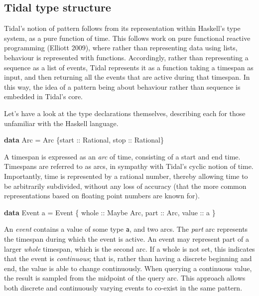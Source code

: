 \documentclass{nime-alternate} %
\newenvironment{Shaded}{\begin{snugshade}}{\end{snugshade}}
\newcommand{\DataTypeTok}[1]{\textcolor[rgb]{0.13,0.29,0.53}{#1}}
\newcommand{\KeywordTok}[1]{\textcolor[rgb]{0.13,0.29,0.53}{\textbf{#1}}}
\newcommand{\NormalTok}[1]{#1}
\newcommand{\OtherTok}[1]{\textcolor[rgb]{0.56,0.35,0.01}{#1}}
\begin{document}
\hypertarget{tidal-type-structure}{%
\subsection{Tidal type structure}\label{tidal-type-structure}}

Tidal's notion of pattern follows from its representation within
Haskell's type system, as a pure function of time. This follows work on
pure functional reactive programming (Elliott 2009), where rather than
representing data using lists, behaviour is represented with functions.
Accordingly, rather than representing a sequence as a list of events,
Tidal represents it as a function taking a timespan as input, and then
returning all the events that are active during that timespan. In this
way, the idea of a pattern being about behaviour rather than sequence is
embedded in Tidal's core.

Let's have a look at the type declarations themselves, describing each
for those unfamiliar with the Haskell language.

\begin{Shaded}
\begin{Highlighting}[]
\KeywordTok{data} \DataTypeTok{Arc} \OtherTok{=} \DataTypeTok{Arc}\NormalTok{ \{}\OtherTok{start ::} \DataTypeTok{Rational}\NormalTok{,}\OtherTok{ stop ::} \DataTypeTok{Rational}\NormalTok{\}}
\end{Highlighting}
\end{Shaded}

A timespan is expressed as an \emph{arc} of time, consisting of a start
and end time. Timespans are referred to as arcs, in sympathy with
Tidal's cyclic notion of time. Importantly, time is represented by a
rational number, thereby allowing time to be arbitrarily subdivided,
without any loss of accuracy (that the more common representations based
on floating point numbers are known for).

\begin{Shaded}
\begin{Highlighting}[]
\KeywordTok{data} \DataTypeTok{Event}\NormalTok{ a }\OtherTok{=} \DataTypeTok{Event}\NormalTok{ \{}
\OtherTok{    whole ::} \DataTypeTok{Maybe} \DataTypeTok{Arc}\NormalTok{,}
\OtherTok{    part ::} \DataTypeTok{Arc}\NormalTok{,}
\OtherTok{    value ::}\NormalTok{ a}
\NormalTok{\}}
\end{Highlighting}
\end{Shaded}

An \emph{event} contains a value of some type \texttt{a}, and two arcs.
The \emph{part} arc represents the timespan during which the event is
active. An event may represent part of a larger \emph{whole} timespan,
which is the second arc. If a whole is not set, this indicates that the
event is \emph{continuous}; that is, rather than having a discrete
beginning and end, the value is able to change continuously. When
querying a continuous value, the result is sampled from the midpoint of
the query arc. This approach allows both discrete and continuously
varying events to co-exist in the same pattern.
\end{document}
